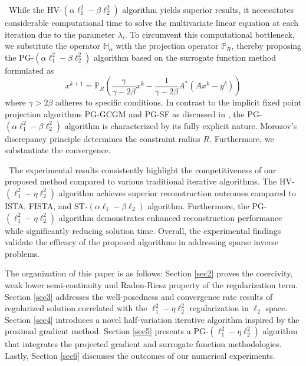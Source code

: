 \documentclass[a4paper,12pt]{article}
\numberwithin{equation}{section}
\begin{document}
\textbullet\ While the HV-$\left(\alpha\ell_{1}^{2}-\beta\ell^{2}_{2}\right)$ algorithm yields superior results, it necessitates considerable computational time to solve the multivariate linear equation at each iteration due to the parameter $\lambda_{i}$. To circumvent this computational bottleneck, we substitute the operator $\mathbb{H}_{\alpha}$ with the projection operator $\mathbb{P}_{R}$, thereby proposing the PG-$\left(\alpha\ell_{1}^{2}-\beta\ell_{2}^{2}\right)$ algorithm based on the surrogate function method formulated as
\begin{equation*}
     x^{k+1}=\mathbb{P}_{R}\left(\frac{\gamma}{\gamma-2\beta}x^{k} -\frac{1}{\gamma-2\beta}A^{*}\left(Ax^{k}-y^{\delta}\right)\right)
\end{equation*}
where $\gamma>2\beta$ adheres to specific conditions. In contrast to the implicit fixed point projection algorithms PG-GCGM and PG-SF as discussed in \cite{DH20}, the PG-$\left(\alpha\ell_{1}^{2}-\beta\ell_{2}^{2}\right)$ algorithm is characterized by its fully explicit nature. Morozov's discrepancy principle determines the constraint radius $R$. Furthermore, we substantiate the convergence.

\textbullet\ The experimental results consistently highlight the competitiveness of our proposed method compared to various traditional iterative algorithms. The HV-$\left(\ell_{1}^{2}-\eta\ell^{2}_{2}\right)$ algorithm achieves superior reconstruction outcomes compared to ISTA, FISTA, and ST-$\left(\alpha\ell_{1}-\beta\ell_{2}\right)$ algorithm. Furthermore, the PG-$\left(\ell_{1}^{2}-\eta\ell^{2}_{2}\right)$ algorithm demonstrates enhanced reconstruction performance while significantly reducing solution time. Overall, the experimental findings validate the efficacy of the proposed algorithms in addressing sparse inverse problems.

\par The organization of this paper is as follows: Section \ref{sec2} proves the coercivity, weak lower semi-continuity and Radon-Riesz property of the regularization term. Section \ref{sec3} addresses the well-posedness and convergence rate results of regularized solution correlated with the $\ell_{1}^{2}-\eta\ell^{2}_{2}$ regularization in $\ell_{2}$ space. Section \ref{sec4} introduces a novel half-variation iterative algorithm inspired by the proximal gradient method. Section \ref{sec5} presents a PG-$\left(\ell_{1}^{2}-\eta\ell_{2}^{2}\right)$ algorithm that integrates the projected gradient and surrogate function methodologies. Lastly, Section \ref{sec6} discusses the outcomes of our numerical experiments.
\end{document}
